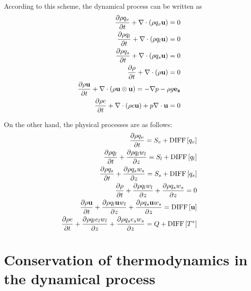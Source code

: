 According to this scheme,
the dynamical process can be written as
\begin{eqnarray}
&&  \frac{\partial \rho q_v}{\partial t}
+ \nabla \cdot\left(\rho q_v {\bf u}\right)  = 0
\label{eq:rho_v_d}\\
&&  \frac{\partial \rho q_l}{\partial t}
+ \nabla \cdot\left(\rho q_l {\bf u}\right) = 0
\label{eq:rho_l_d}\\
&&  \frac{\partial \rho q_s}{\partial t}
+ \nabla \cdot\left(\rho q_s {\bf u}\right)
= 0
\label{eq:rho_s_d}\\
&&  \frac{\partial \rho}{\partial t}
+ \nabla\cdot\left(\rho{\bf u}\right)
=0 \label{eq:rhotot_d}\\
&&  \frac{\partial \rho {\bf u}}{\partial t}
+ \nabla \cdot \left(\rho{\bf u} \otimes {\bf u}\right)
=
-\nabla p - \rho g {\bf e_z} \label{eq:momtot_d}\\
&&  \frac{\partial \rho e  }{\partial t}
+  \nabla \cdot \left( \rho e {\bf u} \right)
 + p \nabla \cdot {\bf u}
=  0 \label{eq:etot_d}
\end{eqnarray}

On the other hand,
the physical processes are as follows:
\begin{eqnarray}
&&  \frac{\partial \rho q_v}{\partial t}  = S_v
+{\rm DIFF}\left[q_v \right]
\label{eq:rho_v_p}\\
&&  \frac{\partial \rho q_l}{\partial t}
+ \frac{\partial \rho q_l w_l}{\partial z}=S_l
+{\rm DIFF}\left[q_l \right]
\label{eq:rho_l_p}\\
&&  \frac{\partial \rho q_s}{\partial t}
+ \frac{\partial \rho q_s w_s}{\partial z}=S_s
+{\rm DIFF}\left[q_s \right]
\label{eq:rho_s_p}\\
&&  \frac{\partial \rho}{\partial t}
+ \frac{\partial \rho q_l w_l}{\partial z}
+ \frac{\partial \rho q_s w_s}{\partial z}
=0 \label{eq:rhotot_p}\\
&&  \frac{\partial \rho {\bf u}}{\partial t}
+ \frac{\partial \rho q_l {\bf u} w_l}{\partial z}
+ \frac{\partial \rho q_s {\bf u} w_s}{\partial z}
= {\rm DIFF}\left[{\bf u} \right]
 \label{eq:momtot_p}\\
&&  \frac{\partial \rho e  }{\partial t}
+ \frac{\partial \rho q_l e_l w_l}{\partial z}
 + \frac{\partial \rho q_s e_s w_s}{\partial z}
=  Q + {\rm DIFF}\left[T^{*} \right] \label{eq:etot_p}
\end{eqnarray}

\section{Conservation of thermodynamics in the dynamical process}

